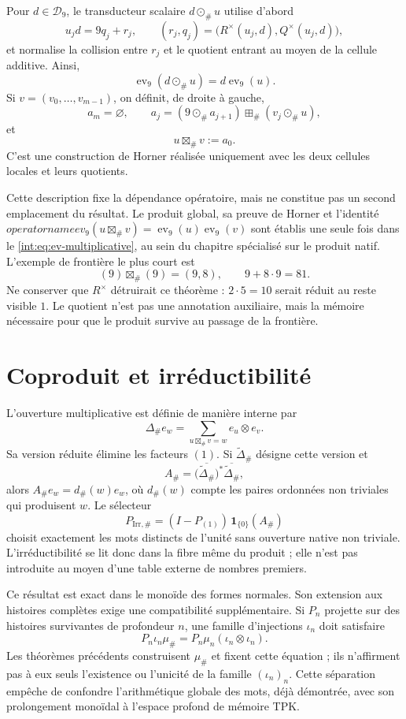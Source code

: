 Pour \(d\in\mathcal D_9\), le transducteur scalaire
\(d\odot_\#u\) utilise d'abord
\[
 u_jd=9q_j+r_j,\qquad
 (r_j,q_j)=\bigl(R^\times(u_j,d),Q^\times(u_j,d)\bigr),
\]
et normalise la collision entre \(r_j\) et le quotient entrant au moyen de la
cellule additive. Ainsi,
\[
 \operatorname{ev}_9(d\odot_\#u)
 =d\operatorname{ev}_9(u).
\]
Si \(v=(v_0,\ldots,v_{m-1})\), on définit, de droite à gauche,
\[
 a_m=\varnothing,\qquad
 a_j=(9\odot_\#a_{j+1})\boxplus_\#(v_j\odot_\#u),
\]
et
\[
 u\boxtimes_\#v:=a_0.
\]
C'est une construction de Horner réalisée uniquement avec les deux cellules
locales et leurs quotients.

Cette description fixe la dépendance opératoire, mais ne constitue pas un
second emplacement du résultat. Le produit global, sa preuve de Horner et
l'identité
\(operatorname{ev}_9(u\boxtimes_\#v)
=\operatorname{ev}_9(u)\operatorname{ev}_9(v)\)
sont établis une seule fois dans le
\cref{int:eq:ev-multiplicative}, au sein du chapitre spécialisé sur le produit
natif.
L'exemple de frontière le plus court est
\[
 (9)\boxtimes_\#(9)=(9,8),\qquad 9+8\cdot9=81.
\]
Ne conserver que \(R^\times\) détruirait ce théorème : \(2\cdot5=10\)
serait réduit au reste visible \(1\). Le quotient n'est pas une annotation
auxiliaire, mais la mémoire nécessaire pour que le produit survive au passage de
la frontière.

\section{Coproduit et irréductibilité}

L'ouverture multiplicative est définie de manière interne par
\[
 \Delta_\#e_w
 =\sum_{u\boxtimes_\#v=w}e_u\otimes e_v.
\]
Sa version réduite élimine les facteurs \((1)\). Si
\(\widetilde\Delta_\#\) désigne cette version et
\[
 A_\#=
 \bigl(\overline{\widetilde\Delta_\#}\bigr)^*
 \overline{\widetilde\Delta_\#},
\]
alors \(A_\#e_w=d_\#(w)e_w\), où \(d_\#(w)\) compte les paires ordonnées
non triviales qui produisent \(w\). Le sélecteur
\[
 P_{\mathrm{Irr},\#}
 =(I-P_{(1)})\,\mathbf1_{\{0\}}(A_\#)
\]
choisit exactement les mots distincts de l'unité sans ouverture native non
triviale. L'irréductibilité se lit donc dans la fibre même du produit ;
elle n'est pas introduite au moyen d'une table externe de nombres premiers.

Ce résultat est exact dans le monoïde des formes normales. Son extension aux
histoires complètes exige une compatibilité supplémentaire. Si \(P_n\) projette
sur des histoires survivantes de profondeur \(n\), une famille
d'injections \(\iota_n\) doit satisfaire
\[
 P_n\iota_n\mu_\#
 =P_n\mu_n(\iota_n\otimes\iota_n).
\]
Les théorèmes précédents construisent \(\mu_\#\) et fixent cette équation ; ils
n'affirment pas à eux seuls l'existence ou l'unicité de la famille
\((\iota_n)_n\). Cette séparation empêche de confondre l'arithmétique globale des
mots, déjà démontrée, avec son prolongement monoïdal à l'espace profond de
mémoire TPK\@.

